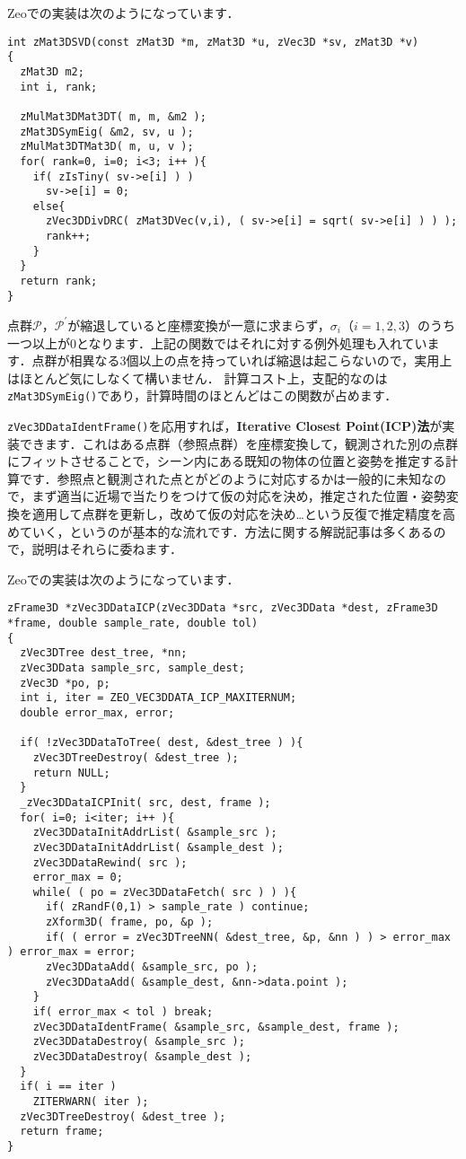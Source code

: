 ﻿\documentclass[a4paper]{jsarticle}
\begin{document}
Zeoでの実装は次のようになっています．
\begin{screen}
\begin{verbatim}
int zMat3DSVD(const zMat3D *m, zMat3D *u, zVec3D *sv, zMat3D *v)
{
  zMat3D m2;
  int i, rank;

  zMulMat3DMat3DT( m, m, &m2 );
  zMat3DSymEig( &m2, sv, u );
  zMulMat3DTMat3D( m, u, v );
  for( rank=0, i=0; i<3; i++ ){
    if( zIsTiny( sv->e[i] ) )
      sv->e[i] = 0;
    else{
      zVec3DDivDRC( zMat3DVec(v,i), ( sv->e[i] = sqrt( sv->e[i] ) ) );
      rank++;
    }
  }
  return rank;
}
\end{verbatim}
\end{screen}
点群$\mathcal{P}$，$\mathcal{P}^{\prime}$が縮退していると座標変換が一意に求まらず，$\sigma_{i}$（$i=1,2,3$）のうち一つ以上が$0$となります．上記の関数ではそれに対する例外処理も入れています．点群が相異なる3個以上の点を持っていれば縮退は起こらないので，実用上はほとんど気にしなくて構いません．
計算コスト上，支配的なのは\verb|zMat3DSymEig()|であり，計算時間のほとんどはこの関数が占めます．

\verb|zVec3DDataIdentFrame()|を応用すれば，{\bf Iterative Closest Point(ICP)法}が実装できます．これはある点群（参照点群）を座標変換して，観測された別の点群にフィットさせることで，シーン内にある既知の物体の位置と姿勢を推定する計算です．参照点と観測された点とがどのように対応するかは一般的に未知なので，まず適当に近場で当たりをつけて仮の対応を決め，推定された位置・姿勢変換を適用して点群を更新し，改めて仮の対応を決め…という反復で推定精度を高めていく，というのが基本的な流れです．方法に関する解説記事は多くあるので，説明はそれらに委ねます．

Zeoでの実装は次のようになっています．
\begin{screen}
\begin{verbatim}
zFrame3D *zVec3DDataICP(zVec3DData *src, zVec3DData *dest, zFrame3D *frame, double sample_rate, double tol)
{
  zVec3DTree dest_tree, *nn;
  zVec3DData sample_src, sample_dest;
  zVec3D *po, p;
  int i, iter = ZEO_VEC3DDATA_ICP_MAXITERNUM;
  double error_max, error;

  if( !zVec3DDataToTree( dest, &dest_tree ) ){
    zVec3DTreeDestroy( &dest_tree );
    return NULL;
  }
  _zVec3DDataICPInit( src, dest, frame );
  for( i=0; i<iter; i++ ){
    zVec3DDataInitAddrList( &sample_src );
    zVec3DDataInitAddrList( &sample_dest );
    zVec3DDataRewind( src );
    error_max = 0;
    while( ( po = zVec3DDataFetch( src ) ) ){
      if( zRandF(0,1) > sample_rate ) continue;
      zXform3D( frame, po, &p );
      if( ( error = zVec3DTreeNN( &dest_tree, &p, &nn ) ) > error_max ) error_max = error;
      zVec3DDataAdd( &sample_src, po );
      zVec3DDataAdd( &sample_dest, &nn->data.point );
    }
    if( error_max < tol ) break;
    zVec3DDataIdentFrame( &sample_src, &sample_dest, frame );
    zVec3DDataDestroy( &sample_src );
    zVec3DDataDestroy( &sample_dest );
  }
  if( i == iter )
    ZITERWARN( iter );
  zVec3DTreeDestroy( &dest_tree );
  return frame;
}
\end{verbatim}
\end{screen}
\end{document}
